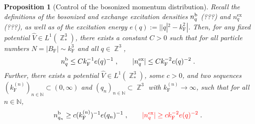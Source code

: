 \documentclass[12pt,a4paper]{article}
\numberwithin{equation}{section}
\newcommand{\NNN}{\mathbb{N}}
\newcommand{\1}{\mathbb{I}}
\renewcommand{\b}{\textnormal{b}}
\newcommand{\ex}{\mathrm{ex}}
\newcommand{\F}{\mathrm{F}}
\DeclareMathOperator{\Z}{\mathbb{Z}}
\theoremstyle{plain}
\newtheorem{proposition}[theorem]{Proposition}
\theoremstyle{definition}
\theoremstyle{remark}
\theoremstyle{plain}
\theoremstyle{definition}
\theoremstyle{remark}
\begin{document}
\begin{proposition}[Control of the bosonized momentum distribution] \label{prop:nqb_nqex_bounds}
Recall the definitions of the bosonized and exchange excitation densities $ n_q^{\b} $ (???) and $ n_q^{\ex} $ (???), as well as of the excitation energy $ e(q) := ||q|^2 - k_{\F}^2| $. Then, for any fixed potential $ \hat{V} \in L^1(\Z^3_*) $, there exists a constant $ C > 0 $ such that for all particle numbers $ N = |B_{\F}| \sim k_{\F}^3 $ and all $ q \in \Z^3 $,
\begin{equation} \label{eq:nqb_nqex_upperbound}
	n_q^{\b}
	\le C k_{\F}^{-1} e(q)^{-1} \;, \qquad
	|n_q^{\ex}|
	\le C k_{\F}^{-2} e(q)^{-2} \;.
\end{equation}
Further, there exists a potential $ \hat{V} \in L^1(\Z^3_*) $, some $ c > 0 $, and two sequences $ (k_{\F}^{(n)})_{n \in \NNN} \subset (0,\infty) $ and $ (q_n)_{n \in \NNN} \subset \Z^3 $ with $ k_{\F}^{(n)} \to \infty $, such that for all $ n \in \NNN $,
\begin{equation} \label{eq:nqb_nqex_lowerbound}
	n_{q_n}^{\b}
	\ge c (k_{\F}^{(n)})^{-1} e(q_n)^{-1} \;, \qquad
	\textcolor{red}{|n_q^{\ex}|
	\ge c k_{\F}^{-2} e(q)^{-2}} \;.
\end{equation}
\end{proposition}
\end{document}
